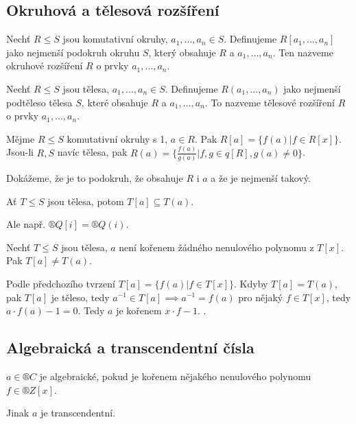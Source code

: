 \documentclass[12pt]{article}                   %
\begin{document}
    \subsection{Okruhová a tělesová rozšíření}
        \begin{definice}
            Nechť $R ≤ S$ jsou komutativní okruhy, $a_1, …, a_n \in S$. Definujeme $R[a_1, …, a_n]$ jako nejmenší podokruh okruhu $S$, který obsahuje $R$ a $a_1, …, a_n$. Ten nazveme okruhové rozšíření $R$ o prvky $a_1, …, a_n$.

            Nechť $R ≤ S$ jsou tělesa, $a_1, …, a_n \in S$. Definujeme $R(a_1, …, a_n)$ jako nejmenší podtěleso tělesa $S$, které obsahuje $R$ a $a_1, …, a_n$. To nazveme tělesové rozšíření $R$ o prvky $a_1, …, a_n$.
        \end{definice}

        \begin{tvrzeni}
            Mějme $R ≤ S$ komutativní okruhy s 1, $a \in R$. Pak $R[a] = \{f(a) | f \in R[x]\}$. Jsou-li $R, S$ navíc tělesa, pak $R(a) = \{\frac{f(a)}{g(a)} | f, g \in q[R], g(a) ≠ 0\}$.

            \begin{dukazin}
                Dokážeme, že je to podokruh, že obsahuje $R$ i $a$ a že je nejmenší takový.
            \end{dukazin}
        \end{tvrzeni}


        \begin{pozorovani}
            Ať $T ≤ S$ jsou tělesa, potom $T[a] \subseteq T(a)$.

            Ale např. $®Q[i] = ®Q(i)$.
        \end{pozorovani}

        \begin{tvrzeni}
            Nechť $T ≤ S$ jsou tělesa, $a$ není kořenem žádného nenulového polynomu z $T[x]$. Pak $T[a] ≠ T(a)$.

            \begin{dukazin}
                Podle předchozího tvrzení $T[a] = \{f(a) | f \in T[x]\}$. Kdyby $T[a] = T(a)$, pak $T[a]$ je těleso, tedy $a^{-1} \in T[a] \implies a^{-1} = f(a)$ pro nějaký $f \in T[x]$, tedy $a·f(a) - 1 = 0$. Tedy $a$ je kořenem $x·f - 1$. \lightning.
            \end{dukazin}
        \end{tvrzeni}

    \subsection{Algebraická a transcendentní čísla}
        \begin{definice}
            $a \in ®C$ je algebraické, pokud je kořenem nějakého nenulového polynomu $f \in ®Z[x]$.

            Jinak $a$ je transcendentní.
        \end{definice}
\end{document}
